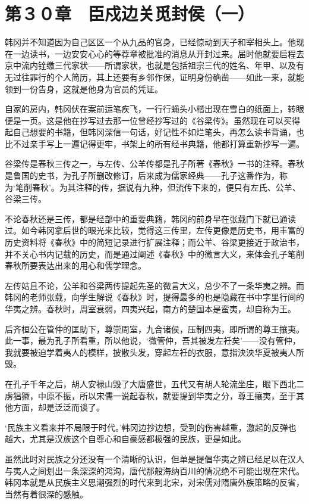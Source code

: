 \section{第３０章　臣戍边关觅封侯（一）}

韩冈并不知道因为自己区区一个从九品的官身，已经惊动到天子和宰相头上。他现在一边读书，一边安安心心的等荐章被批准的消息从开封过来。届时他就要启程去京中流内铨缴三代家状——所谓家状，也就是包括祖宗三代的姓名、年甲、以及有无过往罪行的个人简历，其上还要有乡邻作保，证明身份确凿——如此一来，就能领到一份告身，这就是他身为官员的凭证。

自家的房内，韩冈伏在案前运笔疾飞，一行行蝇头小楷出现在雪白的纸面上，转眼便是一页。这是他在抄写过去那一位曾经抄写过的《谷梁传》。虽然现在可以买得起自己想要的书籍，但韩冈深信一句话，好记性不如烂笔头，再怎么读书背诵，也比不过亲手写上一遍记得更牢，书架上的所有经书典籍，他都打算重新抄写一遍。

谷梁传是春秋三传之一，与左传、公羊传都是孔子所著《春秋》一书的注释。春秋是鲁国的史书，为孔子所删改修订，后来成为儒家经典——孔子这番作为，称为‘笔削春秋’。为其注释的传，据说有九种，但流传下来的，便只有左氏、公羊、谷梁三传。

不论春秋还是三传，都是经部中的重要典籍，韩冈的前身早在张载门下就已通读过。如今韩冈拿后世的眼光来比较，觉得这三传里，左传更像是历史书，用丰富的历史资料将《春秋》中的简短记录进行扩展注释；而公羊、谷梁更接近于政治书，并不关心书内记载的历史，而是通过阐述《春秋》中的微言大义，来体会孔子笔削春秋所要表达出来的用心和儒学理念。

左传姑且不论，公羊和谷梁两传提起先圣的微言大义，总少不了一条华夷之辨。而韩冈的老师张载，向学生解说《春秋》时，提得最多的也是隐藏在书中字里行间的华夷之辨。春秋时，周室衰弱，四夷兴起，南方的楚国本是蛮夷，却自称为王。

后齐桓公在管仲的匡助下，尊崇周室，九合诸侯，压制四夷，即所谓的尊王攘夷。此一事，最为孔子所看重，所以他说，‘微管仲，吾其被发左衽矣’——没有管仲，我就要被迫学着夷人的模样，披散头发，穿起左衽的衣服，意指泱泱华夏被夷人所毁。

在孔子千年之后，胡人安禄山毁了大唐盛世，五代又有胡人轮流坐庄，眼下西北二虏猖獗，中原不振，所以宋儒一说起春秋，就要提到华夷之分，尊王攘夷，至于其他方面，却是泛泛而谈了。

‘民族主义看来并不局限于时代。’韩冈边抄边想，受到的伤害越重，激起的反弹也越大，尤其是汉族这个自尊心和自豪感都极强的民族，更是如此。

虽然此时对民族之分还没有一个清晰的认识，但单是提倡华夷之辨已经足以在汉人与夷人之间划出一条深深的鸿沟，唐代那般海纳百川的情况绝不可能出现在宋代。韩冈本就是从民族主义思潮强烈的时代来到北宋，对宋儒对隋唐外族策略的反省，当然有着很深的感触。


